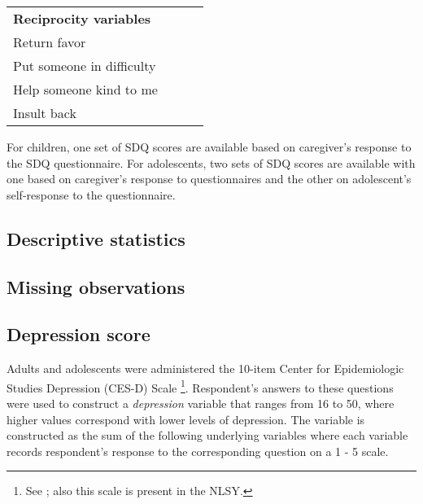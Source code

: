\begin{table}[H]
\begin{center}
{\begin{threeparttable}
\begin{tabular}{L{5.5cm}C{2cm} C{2cm} C{2cm}}
		\textbf{Reciprocity variables}							&									&							&								\\
		\quad \quad Return favor								&									& \checkmark				& \checkmark					 \\
		\quad \quad Put someone in difficulty					&									& \checkmark				& \checkmark					 \\	
		\quad \quad Help someone kind to me					&									& \checkmark				& \checkmark					 \\
		\quad \quad Insult back								&									& \checkmark				& \checkmark					 \\

		
		\hline
		\end{tabular}

		\begin{tablenotes}
		\singlespace
		\footnotesize{
			\item [1] For children, one set of SDQ scores are available based on caregiver's response to the SDQ questionnaire. For adolescents, two sets of SDQ scores are available with one based on caregiver's response to questionnaires and the other on  adolescent's self-response to the questionnaire.  
		}
		\end{tablenotes}
	\end{threeparttable}
	}
	\end{center}
\end{table}
\setcounter{footnote}{0}

 \clearpage

\begin{landscape}
\subsection{Descriptive statistics}

\end{landscape}

\begin{landscape}
\subsection{Missing observations}

\end{landscape}

\subsection{Depression score}
Adults and adolescents were administered the 10-item Center for Epidemiologic Studies Depression (CES-D) Scale \footnote{See \cite{Radloff_1977_APM}; also this scale is present in the NLSY.}. Respondent's answers to these questions were used to construct a \textit{depression} variable that ranges from 16 to 50, where higher values correspond with lower levels of depression. The variable is constructed as the sum of the following underlying variables where each variable records respondent's response to the corresponding question on a 1 - 5 scale. \\

